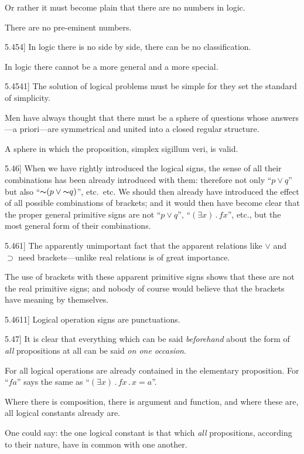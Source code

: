 \documentclass[12pt,oneside]{book}[2007/10/19]
\newcommand{\PropositionE}[2]{%
  \item[\phantomsection\label{PropE:#1}\PropGRef{#1}] #2%
}
\newcommand{\PropGRef}[1]{\hyperref[PropG:#1]{#1}}
\newcommand{\DPtypo}[2]{#2}
\newcommand{\Not}[1]{\mathord{\thicksim} #1}
\newcommand{\DotOp}{\mathbin{.}}
\newcommand{\Implies}{\supset}
\begin{document}
\begin{propositions}
{Or rather it must become plain that there are
no numbers in logic.

There are no pre-eminent numbers.}


\PropositionE{5.454}
{In logic there is no side by side, there can be
no classification.

In logic there cannot be a more general and a
more special.}


\PropositionE{5.4541}
{The solution of logical problems must be simple
for they set the standard of simplicity.

Men have always thought that there must be a
sphere of questions whose answers---a priori---are
symmetrical and united into a closed regular
structure.

A sphere in which the proposition, simplex
sigillum veri, is valid.}


\PropositionE{5.46}
{When we have rightly introduced the logical
signs, the sense of all their combinations has been
already introduced with them: therefore not only
``$p \lor q$'' but also ``$\Not{(p \lor \Not{q})}$'', etc.\ etc. We should
then already have introduced the effect of all
possible combinations of brackets; and it would
then have become clear that the proper general
primitive signs are not ``$p \lor q$'', ``$(\exists x) \DotOp fx$'', etc.,
but the most general form of their combinations.}


\PropositionE{5.461}
{The apparently unimportant fact that the apparent
relations like \DPtypo{$v$}{$\lor$} and $\Implies$ need brackets---unlike
real relations is of great importance.

The use of brackets with these apparent primitive
signs shows that these are not the real
primitive signs; and nobody of course would
believe that the brackets have meaning by themselves.}


\PropositionE{5.4611}
{Logical operation signs are punctuations.}


\PropositionE{5.47}
{It is clear that everything which can be said
\emph{beforehand} about the form of \emph{all} propositions at
all can be said \emph{on one occasion}.

For all logical operations are already contained
in the elementary proposition. For ``$fa$'' says
the same as ``$(\exists x) \DotOp fx \DotOp x = a$''.

Where there is composition, there is argument
and function, and where these are, all logical
constants already are.

One could say: the one logical constant is that
which \emph{all} propositions, according to their nature,
have in common with one another.

}
\end{propositions}
\end{document}
